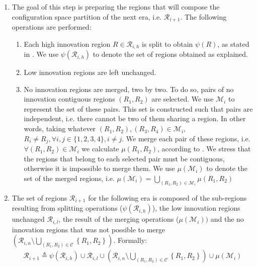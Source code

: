 \begin{enumerate}
\item The goal of this step is preparing the regions that will compose the configuration space partition of the next era, i.e. $\mathscr{R}_{i+1}$. The following operations are performed:
	\begin{enumerate}
		\item Each high innovation region $R\in\mathscr{R}_{i,h}$ is split to obtain $\psi(R)$, as stated in . We use $\psi\left(\mathscr{R}_{i,h}\right)$ to denote the set of regions obtained as explained.
		\item Low innovation regions are left unchanged.
		\item No innovation regions are merged, two by two. To do so, pairs of no innovation contiguous regions $(R_1,R_2)$ are selected. We use $\mathscr{M}_i$ to represent the set of these pairs. This set is constructed such that pairs are independent, i.e. there cannot be two of them sharing a region. In other words, taking whatever $(R_1,R_2),(R_3,R_4) \in \mathscr{M}_i$, $R_i \neq R_j, \forall i,j\in\lbrace1,2,3,4\rbrace, i\neq j$. 
We merge each pair of these regions, i.e. $\forall (R_1,R_2)\in\mathscr{M}_i$ we calculate $\mu(R_1,R_2)$, according to .
We stress that the regions that belong to each selected pair must be contiguous, otherwise it is impossible to merge them. We use $\mu(\mathscr{M}_i)$ to denote the set of the merged regions, i.e. $\mu(\mathscr{M}_i) = \bigcup_{(R_1,R_2)\in\mathscr{M}_i} \mu(R_1,R_2)$
	\end{enumerate}


\item The set of regions $\mathcal{R}_{i+1}$ for the following era is composed of the sub-regions resulting from splitting operations ($\psi\left(\mathscr{R}_{i,h}\right)$), the low innovation regions unchanged $\mathcal{R}_{i,l}$, the result of the merging operations ($\mu(\mathscr{M}_i))$ and the no innovation regions that was not possible to merge $\left(\mathcal{R}_{i,n}\setminus\bigcup_{\left(R_{1},R_{2}\right)\in\mathcal{C}}\left\{ R_{1},R_{2}\right\} \right)$. Formally:
	\begin{align} 
	\mathcal{R}_{i+1} \triangleq
	\psi\left(\mathscr{R}_{i,h}\right) \cup \mathcal{R}_{i,l}\cup
	\left(\mathcal{R}_{i,n}\setminus\bigcup_{\left(R_{1},R_{2}\right)\in\mathcal{C}}\left\{ R_{1},R_{2}\right\} \right)\cup \mu(\mathscr{M}_i)
	\end{align}
\end{enumerate}

